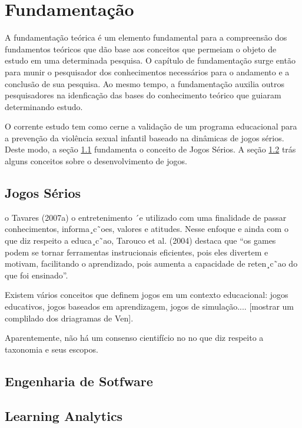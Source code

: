 \chapter{Fundamentação}\label{ch:Fundamentacao}

A fundamentação teórica é um elemento fundamental para a compreensão dos fundamentos teóricos que dão base aos conceitos que permeiam o objeto de estudo em uma determinada pesquisa. O capítulo de fundamentação surge então para munir o pesquisador dos conhecimentos necessários para o andamento e a conclusão de sua pesquisa. Ao mesmo tempo, a fundamentação auxilia outros pesquisadores na idenficação das bases do conhecimento teórico que guiaram determinando estudo. 

O corrente estudo tem como cerne a validação de um programa educacional para a prevenção da violência sexual infantil baseado na dinâmicas de jogos sérios. Deste modo, a seção \ref{sec:JogosSerios} fundamenta o conceito de Jogos Sérios. A seção \ref{sec:Engenharia} trás alguns conceitos sobre o desenvolvimento de jogos.

\section{Jogos Sérios}\label{sec:JogosSerios}


o Tavares (2007a) o entretenimento ´e utilizado com uma finalidade de passar conhecimentos, informa¸c˜oes, valores e
atitudes.%
Nesse enfoque e ainda com o que diz respeito a educa¸c˜ao, Tarouco et al. (2004) destaca que “os games podem se tornar ferramentas instrucionais eficientes, pois eles divertem e motivam, facilitando o aprendizado, pois aumenta a capacidade de reten¸c˜ao do que foi ensinado”.


Existem vários conceitos que definem jogos em um contexto educacional: jogos educativos, jogos baseados em aprendizagem, jogos de simulação.... [mostrar um complilado dos driagramas de Ven].

Aparentemente, não há um consenso cientifício no no que diz respeito a taxonomia e seus escopos. 



\section{Engenharia de Sotfware}\label{sec:Engenharia}

\section{Learning Analytics}\label{sec:LA}


